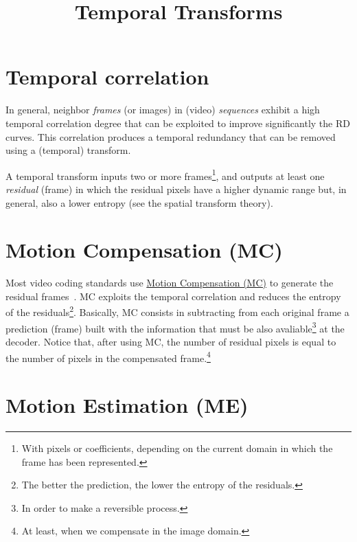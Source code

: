 


\title{Temporal Transforms}

\maketitle
\tableofcontents

\section{Temporal correlation}

In general, neighbor \emph{frames} (or images) in (video)
\emph{sequences} exhibit a high temporal correlation degree that can
be exploited to improve significantly the RD curves. This correlation
produces a temporal redundancy that can be removed using a (temporal)
transform.

A temporal transform inputs two or more frames\footnote{With pixels or
  coefficients, depending on the current domain in which the frame has
  been represented.}, and outputs at least one \emph{residual} (frame)
in which the residual pixels have a higher dynamic range but, in
general, also a lower entropy (see the spatial transform theory).


\section{Motion Compensation (MC)}

Most video coding standards use
\href{https://en.wikipedia.org/wiki/Motion_compensation}{Motion
  Compensation (MC)} to generate the residual
frames~\cite{vruiz__MC}. MC exploits the temporal correlation and
reduces the entropy of the residuals\footnote{The better the
  prediction, the lower the entropy of the residuals.}. Basically, MC
consists in subtracting from each original frame a prediction (frame)
built with the information that must be also avaliable\footnote{In
  order to make a reversible process.} at the decoder. Notice that,
after using MC, the number of residual pixels is equal to the number
of pixels in the compensated frame.\footnote{At least, when we
  compensate in the image domain.}


\section{Motion Estimation (ME)}

